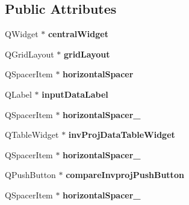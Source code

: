 \subsection*{Public Attributes}
\begin{DoxyCompactItemize}
\item 
\hypertarget{class_ui___input_module_aff44a335ccc46a8bba6caaaf2407a954}{}Q\+Widget $\ast$ {\bfseries central\+Widget}\label{class_ui___input_module_aff44a335ccc46a8bba6caaaf2407a954}

\item 
\hypertarget{class_ui___input_module_a16d3b9a56396afd2d89b497b6fe7c583}{}Q\+Grid\+Layout $\ast$ {\bfseries grid\+Layout}\label{class_ui___input_module_a16d3b9a56396afd2d89b497b6fe7c583}

\item 
\hypertarget{class_ui___input_module_a42f60b85b6b9a3a7bffe5d63bffe776c}{}Q\+Spacer\+Item $\ast$ {\bfseries horizontal\+Spacer}\label{class_ui___input_module_a42f60b85b6b9a3a7bffe5d63bffe776c}

\item 
\hypertarget{class_ui___input_module_adb2c164f4259d5e09d919bf66fe85e9f}{}Q\+Label $\ast$ {\bfseries input\+Data\+Label}\label{class_ui___input_module_adb2c164f4259d5e09d919bf66fe85e9f}

\item 
\hypertarget{class_ui___input_module_a9ee3bc1119cc7022f034724d4c886b48}{}Q\+Spacer\+Item $\ast$ {\bfseries horizontal\+Spacer\+\_}\label{class_ui___input_module_a9ee3bc1119cc7022f034724d4c886b48}

\item 
\hypertarget{class_ui___input_module_a9ee34cc594589b24e37ae831ae5ce8ff}{}Q\+Table\+Widget $\ast$ {\bfseries inv\+Proj\+Data\+Table\+Widget}\label{class_ui___input_module_a9ee34cc594589b24e37ae831ae5ce8ff}

\item 
\hypertarget{class_ui___input_module_a2673e00aa090f00149f9eeb8c326392c}{}Q\+Spacer\+Item $\ast$ {\bfseries horizontal\+Spacer\+\_}\label{class_ui___input_module_a2673e00aa090f00149f9eeb8c326392c}

\item 
\hypertarget{class_ui___input_module_a0eec3d69a77652f71ca6251430544bc2}{}Q\+Push\+Button $\ast$ {\bfseries compare\+Invproj\+Push\+Button}\label{class_ui___input_module_a0eec3d69a77652f71ca6251430544bc2}

\item 
\hypertarget{class_ui___input_module_aafdff9d03c699a4c84a66bae9365c42c}{}Q\+Spacer\+Item $\ast$ {\bfseries horizontal\+Spacer\+\_}\label{class_ui___input_module_aafdff9d03c699a4c84a66bae9365c42c}


\end{DoxyCompactItemize}
